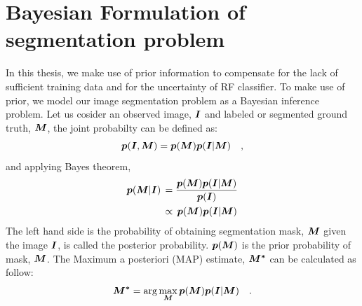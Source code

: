 \section{Bayesian Formulation of segmentation problem}
In this thesis, we make use of prior information to compensate for the lack of sufficient training data and for the uncertainty of RF classifier. To make use of prior, we model our image segmentation problem as a Bayesian inference problem. Let us cosider an observed image, $\boldsymbol{I}$ and labeled or segmented ground truth, $\boldsymbol{M}$, the joint probabilty can be defined as:
\begin{equation*}
\boldsymbol{p}(\boldsymbol{I}, \boldsymbol{M}) = \boldsymbol{p}(\boldsymbol{M}) \boldsymbol{p}(\boldsymbol{I}|\boldsymbol{M}) \quad ,
\end{equation*}
and applying Bayes theorem,
\begin{align*}
\boldsymbol{p}(\boldsymbol{M}|\boldsymbol{I}) \, & = \frac{\boldsymbol{p}(\boldsymbol{M}) \boldsymbol{p}(\boldsymbol{I}|\boldsymbol{M})}{\boldsymbol{p}(\boldsymbol{I})} \\
						& \propto \, {\boldsymbol{p}(\boldsymbol{M}) \boldsymbol{p}(\boldsymbol{I}|\boldsymbol{M})}
\end{align*}
The left hand side is the probability of obtaining segmentation mask, $\boldsymbol{M}$ given the image $\boldsymbol{I}$, is called the posterior probability. $\boldsymbol{p}(\boldsymbol{M})$ is the prior probability of mask, $\boldsymbol{M}$. The Maximum a posteriori (MAP) estimate, $\boldsymbol{M^*}$ can be calculated as follow:
\begin{equation}
\boldsymbol{M^*} = \arg\max_{\boldsymbol{M}}{\boldsymbol{p}(\boldsymbol{M}) \boldsymbol{p}(\boldsymbol{I}|\boldsymbol{M})} \quad .
\end{equation}

